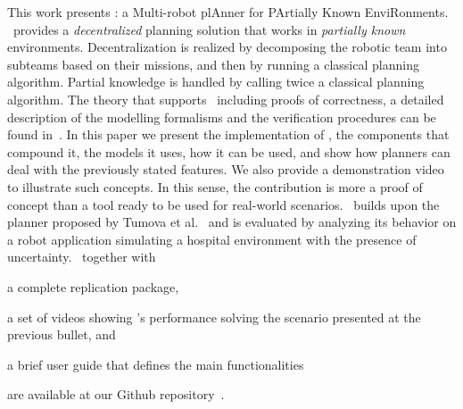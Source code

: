This work presents  \toolName: a Multi-robot plAnner for PArtially Known EnviRonments.
 \toolName\ provides a  \emph{decentralized} planning solution that works in \emph{partially known} environments.
Decentralization is realized by decomposing the robotic team into subteams based on their missions, and then by running a classical planning algorithm.
Partial knowledge is handled by calling twice a classical planning algorithm.
The theory that supports \toolName\ including proofs of correctness, a detailed description of the modelling formalisms and the verification procedures can be found in~\cite{menghi2018multi}.
In this paper we present the implementation of \toolName, the components that compound it, the models it uses, how it can be used, and  show how planners can deal with the previously stated features. 
We also provide a demonstration video to illustrate such concepts.
In this sense, the contribution is more a proof of concept than a tool ready to be used for real-world scenarios.
\toolName~builds upon the planner proposed by Tumova et al.~\cite{tumova2016multi} and
is evaluated by analyzing its behavior on a robot application simulating a hospital environment with the presence of uncertainty.
\toolName\  together with 
\begin{enumerate*}
\item a complete replication package,
\item a set of videos showing \toolName's performance solving the scenario presented at the previous bullet, and
\item a brief user guide that defines the main functionalities 
\end{enumerate*}
 are available at our Github repository~\cite{repo}. %




